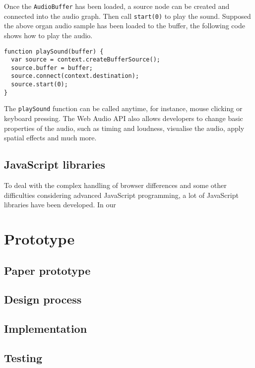 Once the \verb|AudioBuffer| has been loaded, a source node can be created and connected into the audio graph. Then call \verb|start(0)| to play the sound. Supposed the above organ audio sample has been loaded to the buffer, the following code shows how to play the audio.
\begin{verbatim}
function playSound(buffer) {
  var source = context.createBufferSource();
  source.buffer = buffer;
  source.connect(context.destination);
  source.start(0);
}
\end{verbatim}

The \verb|playSound| function can be called anytime, for instance, mouse clicking or keyboard pressing. The Web Audio API also allows developers to change basic properties of the audio, such as timing and loudness, visualise the audio, apply spatial effects and much more.

\subsection{JavaScript libraries}
To deal with the complex handling of browser differences and some other difficulties considering advanced JavaScript programming, a lot of JavaScript libraries have been developed. In our 

\section{Prototype}
\subsection{Paper prototype}
\subsection{Design process}
\subsection{Implementation}
\subsection{Testing}
